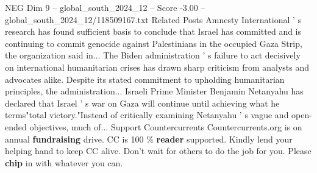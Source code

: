 \begin{textsample}{NEG Dim 9 – global\_south\_2024\_12 – Score -3.00 – global\_south\_2024\_12/118509167.txt}
Related Posts Amnesty International ' s research has found sufficient basis to conclude that Israel has committed and is continuing to commit genocide against Palestinians in the occupied Gaza Strip, the organization said in...
The Biden administration ' s failure to act decisively on international humanitarian crises has drawn sharp criticism from analysts and advocates alike.
Despite its stated commitment to upholding humanitarian principles, the administration...
Israeli Prime Minister Benjamin Netanyahu has declared that Israel ' s war on Gaza will continue until achieving what he terms"total victory."Instead of critically examining Netanyahu ' s vague and open-ended objectives, much of...
Support Countercurrents Countercurrents.org is on annual \textbf{fundraising} drive.
CC is 100 \% \textbf{reader} supported.
Kindly lend your helping hand to keep CC alive.
Don't wait for others to do the job for you.
Please \textbf{chip} in with whatever you can.

\end{textsample}

